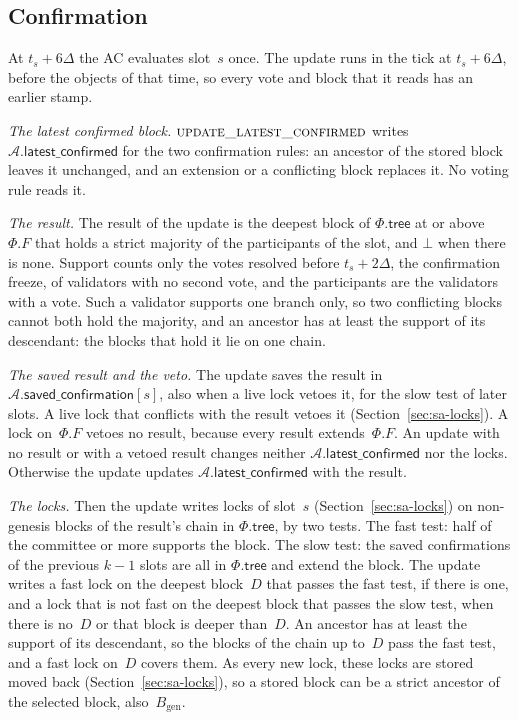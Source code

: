 \documentclass{article}
\newcommand{\genesis}{B_{\mathrm{gen}}}
\newcommand{\AC}{\mathcal A}
\newcommand{\Fr}{\Phi}
\newcommand{\tree}{\mathsf{tree}}
\newcommand{\latestConfirmed}{\mathsf{latest\_confirmed}}
\newcommand{\savedConfirmation}{\mathsf{saved\_confirmation}}
\begin{document}
\subsection{Confirmation}\label{sec:sa-confirmation}

At $t_s+6\Delta$ the AC evaluates slot~$s$ once.  The update runs in the
tick at $t_s+6\Delta$, before the objects of that time, so every vote and
block that it reads has an earlier stamp.

\emph{The latest confirmed block.}
$\Call{update\_latest\_confirmed}{}$ writes $\AC.\latestConfirmed$ for
the two confirmation rules: an ancestor of the stored block leaves it
unchanged, and an extension or a conflicting block replaces it.  No voting
rule reads it.

\emph{The result.}  The result of the update is the deepest block of
$\Fr.\tree$ at or above~$\Fr.F$ that holds a strict majority of the
participants of the slot, and $\bot$ when there is none.  Support counts
only the votes resolved before $t_s+2\Delta$, the confirmation freeze, of
validators with no second vote, and the participants are the validators
with a vote.  Such a validator supports one branch only, so two
conflicting blocks cannot both hold the majority, and an ancestor has at
least the support of its descendant: the blocks that hold it lie on one
chain.

\emph{The saved result and the veto.}  The update saves the result in
$\AC.\savedConfirmation[s]$, also when a live lock vetoes it, for the slow
test of later slots.  A live lock that conflicts with the result vetoes it
(Section~\ref{sec:sa-locks}).  A lock on~$\Fr.F$ vetoes no result, because
every result extends~$\Fr.F$.  An update with no result or with a vetoed
result changes neither $\AC.\latestConfirmed$ nor the locks.  Otherwise
the update updates $\AC.\latestConfirmed$ with the result.

\emph{The locks.}  Then the update writes locks of slot~$s$
(Section~\ref{sec:sa-locks}) on non-genesis blocks of the result's chain
in $\Fr.\tree$, by two tests.  The fast test: half of the committee or
more supports the block.  The slow test: the saved confirmations of the
previous $k-1$ slots are all in $\Fr.\tree$ and extend the block.  The
update writes a fast lock on the deepest block~$D$ that passes the fast
test, if there is one, and a lock that is not fast on the deepest block
that passes the slow test, when there is no~$D$ or that block is deeper
than~$D$.  An ancestor has at least
the support of its descendant, so the blocks of the chain up to~$D$ pass
the fast test, and a fast lock on~$D$ covers them.  As every new lock, these
locks are stored moved back (Section~\ref{sec:sa-locks}), so a stored
block can be a strict ancestor of the selected block, also~$\genesis$.
\end{document}
